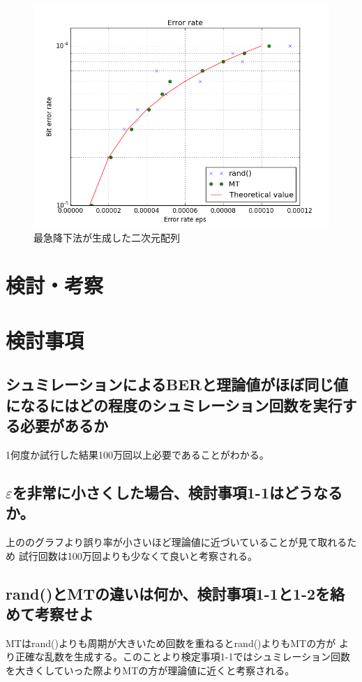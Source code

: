 \documentclass{jsarticle}
\begin{document}
\begin{figure}[H]
  \centering
  \includegraphics[width=12cm]{./graph1.png}
  \caption{最急降下法が生成した二次元配列}
\end{figure}

\section{検討・考察}

\section{検討事項}
\subsection{シュミレーションによるBERと理論値がほぼ同じ値になるにはどの程度のシュミレーション回数を実行する必要があるか}
1何度か試行した結果100万回以上必要であることがわかる。

\subsection{$\varepsilon$を非常に小さくした場合、検討事項1-1はどうなるか。}
上ののグラフより誤り率が小さいほど理論値に近づいていることが見て取れるため
試行回数は100万回よりも少なくて良いと考察される。


\subsection{rand()とMTの違いは何か、検討事項1-1と1-2を絡めて考察せよ}
MTはrand()よりも周期が大きいため回数を重ねるとrand()よりもMTの方が
より正確な乱数を生成する。このことより検定事項1-1ではシュミレーション回数
を大きくしていった際よりMTの方が理論値に近くと考察される。
\end{document}
